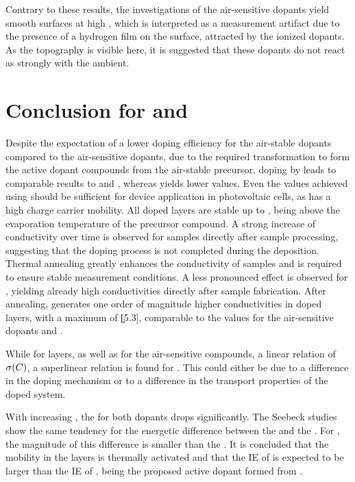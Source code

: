 Contrary to these results, the investigations of the air-sensitive dopants yield smooth surfaces at high \CLongs, which is interpreted as a measurement artifact due to the presence of a hydrogen film on the surface, attracted by the ionized dopants. As the topography is visible here, it is suggested that these dopants do not react as strongly with the ambient.
%
\nopagebreak[0] %
\section{Conclusion for \aob and \dmbi}\label{sec:ResASConclusion}
Despite the expectation of a lower doping efficiency for the air-stable dopants compared to the air-sensitive dopants, due to the required transformation to form the active dopant compounds from the air-stable precursor, doping \CS by \dmbi leads to comparable results to \CrPd and \WPd, whereas \aob yields lower values. Even the values achieved using \aob should be sufficient for device application in photovoltaic cells, as \CS has a high charge carrier mobility.
All doped \CS layers are stable up to \T[100], being above the evaporation temperature of the \aob precursor compound. A strong increase of conductivity over time is observed for \aob samples directly after sample processing, suggesting that the doping process is not completed during the deposition. Thermal annealing greatly enhances the conductivity of \aob samples and is required to ensure stable measurement conditions. A less pronounced effect is observed for \dmbi, yielding already high conductivities directly after sample fabrication. After annealing, \dmbi generates one order of magnitude higher conductivities in doped layers, with a maximum of \c[5.3], comparable to the values for the air-sensitive dopants \CrPd and \WPd.

While for \aob layers, as well as for the air-sensitive compounds, a linear relation of $\c(\C)$, a superlinear relation is found for \dmbi.
This could either be due to a difference in the doping mechanism or to a difference in the transport properties of the doped system.

With increasing \CLong, the \EactLong for both dopants drops significantly. The Seebeck studies show the same tendency for the energetic difference between the \EfLong and the \EtLong. For \aob, the magnitude of this difference is smaller than the \EactLong. It is concluded that the mobility in the \aob layers is thermally activated and that the IE of \aob is expected to be larger than the IE of \OHdmbi, being the proposed active dopant formed from \dmbi.

